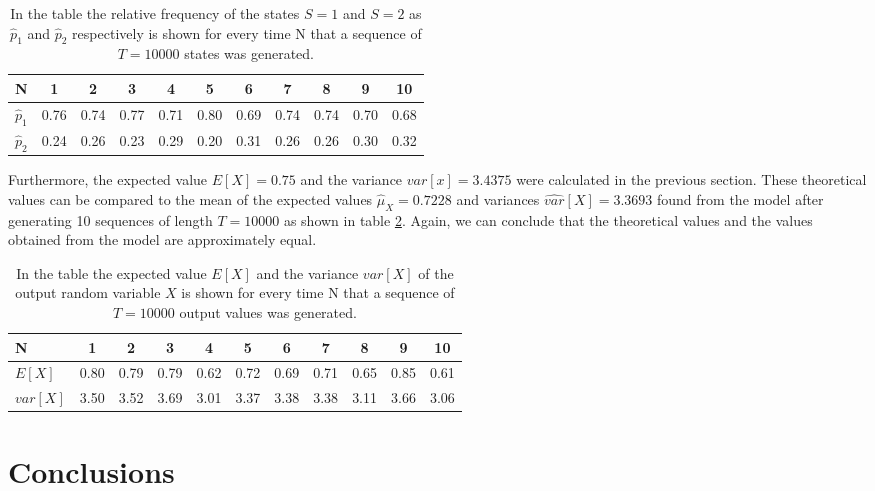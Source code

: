 \documentclass[twocolumn, 10pt]{IEEEtran}
\begin{document}
\setlength{\tabcolsep}{4pt}
\renewcommand{\arraystretch}{1.2}
\begin{table}
\caption{In the table the relative frequency of the states $S=1$ and $S=2$ as $\hat{p}_1$ and $\hat{p}_2$ respectively is shown for every time N that a sequence of $T=10000$ states was generated.\label{tab:statedistribution} }
\begin{tabular}{l c c c c c c c c c c}
 N & 1 & 2 & 3 & 4 & 5 & 6 & 7 & 8 & 9 & 10 \\ \hline
 $\hat{p}_1$ & 0.76 &  0.74  &  0.77  &  0.71   & 0.80   & 0.69  &  0.74 &   0.74 &   0.70 & 0.68\\
 $\hat{p}_2$ &0.24 &   0.26 &  0.23 &   0.29 &  0.20 &  0.31 & 0.26 &    0.26 &   0.30 & 0.32 \\
\end{tabular}
\end{table}

Furthermore, the expected value $E[X] = 0.75$ and the variance $var[x] = 3.4375$ were calculated in the previous section. These theoretical values can be compared to the mean of the expected values $\hat{\mu}_X = 0.7228$ and variances $\hat{var}[X] = 3.3693$ found from the model after generating 10 sequences of length $T=10000$ as shown in table \ref{tab:outputmeanvar}. Again, we can conclude that the theoretical values and the values obtained from the model are approximately equal.

\begin{table}
\caption{In the table the expected value $E[X]$ and the variance $var[X]$ of the output random variable $X$ is shown for every time N that a sequence of $T=10000$ output values was generated.\label{tab:outputmeanvar} }
\begin{tabular}{l c c c c c c c c c c}
 N & 1 & 2 & 3 & 4 & 5 & 6 & 7 & 8 & 9 & 10 \\ \hline
 $E[X]$ & 0.80 &   0.79  &  0.79  &  0.62 &   0.72  &  0.69  &  0.71  &  0.65  &  0.85 & 0.61\\
 $var[X]$ & 3.50 &    3.52 &    3.69 &    3.01 &    3.37 &    3.38 &    3.38 &    3.11 &    3.66 & 3.06 \\
\end{tabular}
\end{table}

\section{Conclusions}
\end{document}
